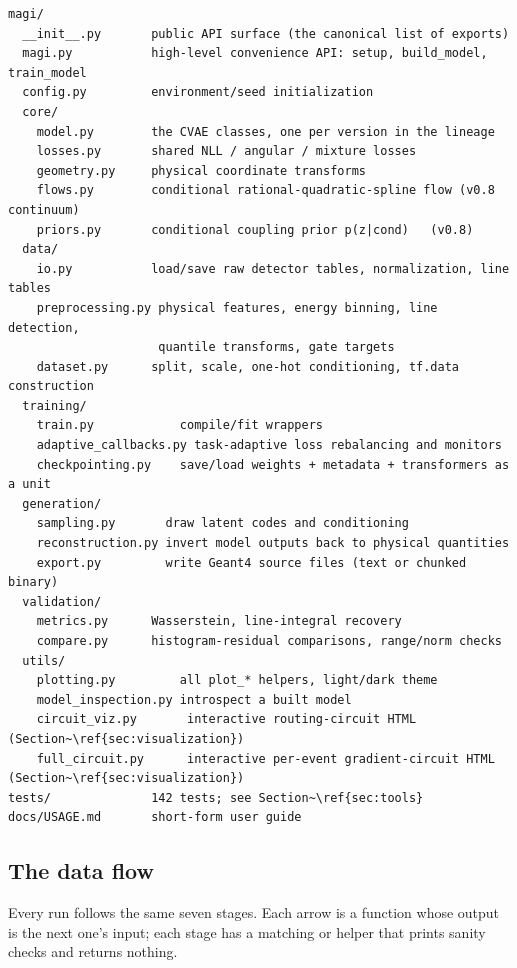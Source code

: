 \documentclass[11pt,a4paper]{article}
\begin{document}
\begin{lstlisting}[language=shell]
magi/
  __init__.py       public API surface (the canonical list of exports)
  magi.py           high-level convenience API: setup, build_model, train_model
  config.py         environment/seed initialization
  core/
    model.py        the CVAE classes, one per version in the lineage
    losses.py       shared NLL / angular / mixture losses
    geometry.py     physical coordinate transforms
    flows.py        conditional rational-quadratic-spline flow (v0.8 continuum)
    priors.py       conditional coupling prior p(z|cond)   (v0.8)
  data/
    io.py           load/save raw detector tables, normalization, line tables
    preprocessing.py physical features, energy binning, line detection,
                     quantile transforms, gate targets
    dataset.py      split, scale, one-hot conditioning, tf.data construction
  training/
    train.py            compile/fit wrappers
    adaptive_callbacks.py task-adaptive loss rebalancing and monitors
    checkpointing.py    save/load weights + metadata + transformers as a unit
  generation/
    sampling.py       draw latent codes and conditioning
    reconstruction.py invert model outputs back to physical quantities
    export.py         write Geant4 source files (text or chunked binary)
  validation/
    metrics.py      Wasserstein, line-integral recovery
    compare.py      histogram-residual comparisons, range/norm checks
  utils/
    plotting.py         all plot_* helpers, light/dark theme
    model_inspection.py introspect a built model
    circuit_viz.py       interactive routing-circuit HTML (Section~\ref{sec:visualization})
    full_circuit.py      interactive per-event gradient-circuit HTML (Section~\ref{sec:visualization})
tests/              142 tests; see Section~\ref{sec:tools}
docs/USAGE.md       short-form user guide
\end{lstlisting}

\subsection{The data flow}

Every run follows the same seven stages. Each arrow is a function whose output
is the next one's input; each stage has a matching  or
 helper that prints sanity checks and returns nothing.
\end{document}
